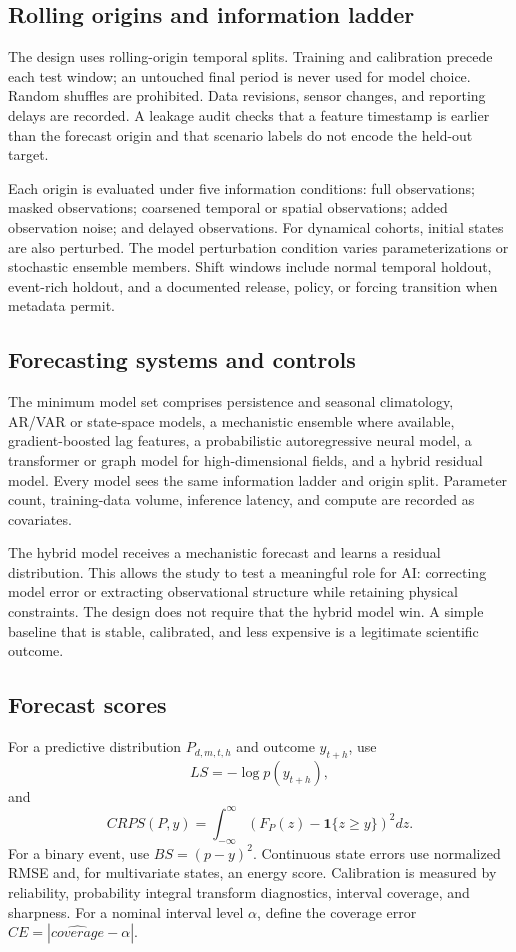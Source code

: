 \documentclass[conference]{IEEEtran}
\begin{document}
\subsection{Rolling origins and information ladder}
The design uses rolling-origin temporal splits. Training and calibration precede each test window; an untouched final period is never used for model choice. Random shuffles are prohibited. Data revisions, sensor changes, and reporting delays are recorded. A leakage audit checks that a feature timestamp is earlier than the forecast origin and that scenario labels do not encode the held-out target.

Each origin is evaluated under five information conditions: full observations; masked observations; coarsened temporal or spatial observations; added observation noise; and delayed observations. For dynamical cohorts, initial states are also perturbed. The model perturbation condition varies parameterizations or stochastic ensemble members. Shift windows include normal temporal holdout, event-rich holdout, and a documented release, policy, or forcing transition when metadata permit.

\subsection{Forecasting systems and controls}
The minimum model set comprises persistence and seasonal climatology, AR/VAR or state-space models, a mechanistic ensemble where available, gradient-boosted lag features, a probabilistic autoregressive neural model, a transformer or graph model for high-dimensional fields, and a hybrid residual model. Every model sees the same information ladder and origin split. Parameter count, training-data volume, inference latency, and compute are recorded as covariates.

The hybrid model receives a mechanistic forecast and learns a residual distribution. This allows the study to test a meaningful role for AI: correcting model error or extracting observational structure while retaining physical constraints. The design does not require that the hybrid model win. A simple baseline that is stable, calibrated, and less expensive is a legitimate scientific outcome.

\subsection{Forecast scores}
For a predictive distribution $P_{d,m,t,h}$ and outcome $y_{t+h}$, use
\begin{equation}
 LS=-\log p(y_{t+h}),
\end{equation}
and
\begin{equation}
 CRPS(P,y)=\int_{-\infty}^{\infty}\left(F_P(z)-\mathbf{1}\{z\ge y\}\right)^2 dz.
\end{equation}
For a binary event, use $BS=(p-y)^2$. Continuous state errors use normalized RMSE and, for multivariate states, an energy score. Calibration is measured by reliability, probability integral transform diagnostics, interval coverage, and sharpness. For a nominal interval level $\alpha$, define the coverage error $CE=|\widehat{coverage}-\alpha|$.
\end{document}

